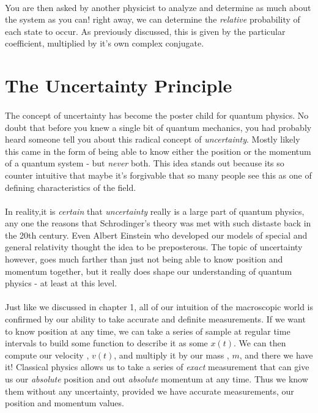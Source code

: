 \documentclass[12pt,letterpaper]{book}
\begin{document}
\paragraph*{}You are then asked by another physicist to analyze and determine as much about the system as you can! right away, we can determine the \textit{relative} probability of each state to occur. As previously discussed, this is given by the particular coefficient, multiplied by it's own complex conjugate.




\section{The Uncertainty Principle}
\paragraph*{}The concept of uncertainty has become the poster child for quantum physics. No doubt that before you knew a single bit of quantum mechanics, you had probably heard someone tell you about this radical concept of \textit{uncertainty}. Mostly likely this came in the form of being able to know either the position or the momentum of a quantum system - but \textit{never} both. This idea stands out because its so counter intuitive that maybe it's forgivable that so many people see this as one of defining characteristics of the field.

\paragraph*{}In reality,it is \textit{certain} that \textit{uncertainty} really is a large part of quantum physics, any one the reasons that Schrodinger's theory was met with such distaste back in the 20th century. Even Albert Einstein who developed our models of special and general relativity thought the idea to be preposterous. The topic of uncertainty however, goes much farther than just not being able to know position and momentum together, but it really does shape our understanding of quantum physics - at least at this level.

\paragraph*{}Just like we discussed in chapter 1, all of our intuition of the macroscopic world is confirmed by our ability to take accurate and definite measurements. If we want to know position at any time, we can take a series of sample at regular time intervals to build some function to describe it as some $x(t)$. We can then compute our velocity , $v(t)$, and multiply it by our mass , $m$, and there we have it! Classical physics allows us to take a series of \textit{exact} measurement that can give us our \textit{absolute} position and out \textit{absolute} momentum at any time. Thus we know them without any uncertainty, provided we have accurate measurements, our position and momentum values.
\end{document}

